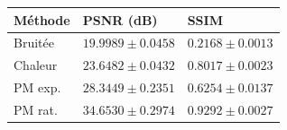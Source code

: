 \begin{tabular}{lll}
\toprule
Méthode & PSNR (dB) & SSIM \\
\midrule
Bruitée & $19.9989 \pm 0.0458$ & $0.2168 \pm 0.0013$ \\
Chaleur & $23.6482 \pm 0.0432$ & $0.8017 \pm 0.0023$ \\
PM exp. & $28.3449 \pm 0.2351$ & $0.6254 \pm 0.0137$ \\
PM rat. & $34.6530 \pm 0.2974$ & $0.9292 \pm 0.0027$ \\
\bottomrule
\end{tabular}
